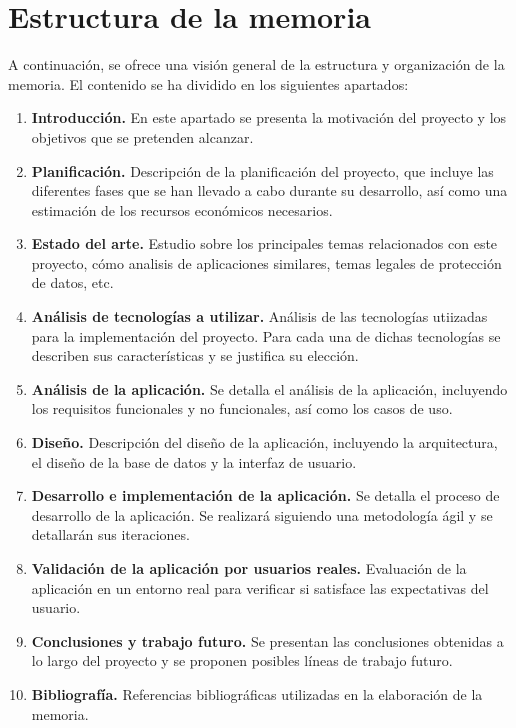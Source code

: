 \section{Estructura de la memoria}
\label{sec:estructura}

A continuación, se ofrece una visión general de la estructura y organización de la memoria. El contenido se ha dividido en los siguientes apartados:

\begin{enumerate}
	\item \textbf{Introducción.} En este apartado se presenta la motivación del proyecto y los objetivos que se pretenden alcanzar.
	\item \textbf{Planificación.} Descripción de la planificación del proyecto, que incluye las diferentes fases que se han llevado a cabo durante su desarrollo, así como una estimación de los recursos económicos necesarios.
	\item \textbf{Estado del arte.} Estudio sobre los principales temas relacionados con este proyecto, cómo analisis de aplicaciones similares, temas legales de protección de datos, etc.
	\item \textbf{Análisis de tecnologías a utilizar.} Análisis de las tecnologías utiizadas para la implementación del proyecto. Para cada una de dichas tecnologías se describen sus características y se justifica su elección.
	\item \textbf{Análisis de la aplicación.} Se detalla el análisis de la aplicación, incluyendo los requisitos funcionales y no funcionales, así como los casos de uso.
	\item \textbf{Diseño.} Descripción del diseño de la aplicación, incluyendo la arquitectura, el diseño de la base de datos y la interfaz de usuario.
	\item \textbf{Desarrollo e implementación de la aplicación.} Se detalla el proceso de desarrollo de la aplicación. Se realizará siguiendo una metodología ágil y se detallarán sus iteraciones.
	\item \textbf{Validación de la aplicación por usuarios reales.} Evaluación de la aplicación en un entorno real para verificar si satisface las expectativas del usuario.
	\item \textbf{Conclusiones y trabajo futuro.} Se presentan las conclusiones obtenidas a lo largo del proyecto y se proponen posibles líneas de trabajo futuro.
	\item \textbf{Bibliografía.} Referencias bibliográficas utilizadas en la elaboración de la memoria.

\end{enumerate}


\newpage